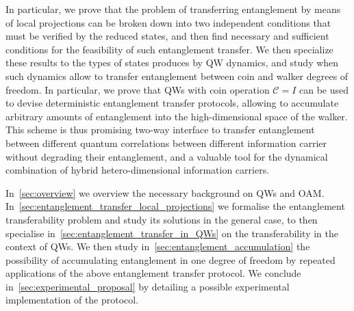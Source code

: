 \documentclass[
	aps, pra,
	superscriptaddress, twocolumn,
	floatfix,
	10pt
]{revtex4-1}
\newcommand{\parTitle}[1]{\noindent{\color{Mahogany}(\emph{#1})}}
\newcommand{\calC}{{\mathcal{C}}}
\newcommand{\MP}[1]{\textcolor{blue}{Mauro: #1}}
\renewcommand{\parTitle}[1]{}
\begin{document}
\parTitle{Results}
In particular, we prove that the problem of transferring entanglement by means of local projections can be broken down into two independent conditions that must be verified by the reduced states, and then find necessary and sufficient conditions for the feasibility of such entanglement transfer.
We then specialize these results to the types of states produces by QW dynamics, and study when such dynamics allow to transfer entanglement between coin and walker degrees of freedom.
In particular, we prove that QWs with coin operation $\calC=I$ can be used to devise deterministic entanglement transfer protocols, allowing to accumulate arbitrary amounts of entanglement into the high-dimensional space of the walker.
This scheme is thus promising two-way interface to transfer entanglement between different quantum correlations between different information carrier without degrading their entanglement, and a valuable tool for the dynamical combination of hybrid hetero-dimensional information carriers.

\parTitle{Tentative outline}
In~\cref{sec:overview} we overview the necessary background on QWs and OAM.
In~\cref{sec:entanglement_transfer_local_projections} we formalise the entanglement transferability problem and study its solutions in the general case, to then specialise in~\cref{sec:entanglement_transfer_in_QWs} on the transferability in the context of QWs.
We then study in~\cref{sec:entanglement_accumulation} the possibility of accumulating entanglement in one degree of freedom by repeated applications of the above entanglement transfer protocol.
We conclude in~\cref{sec:experimental_proposal} by detailing a possible experimental implementation of the protocol.


\end{document}
